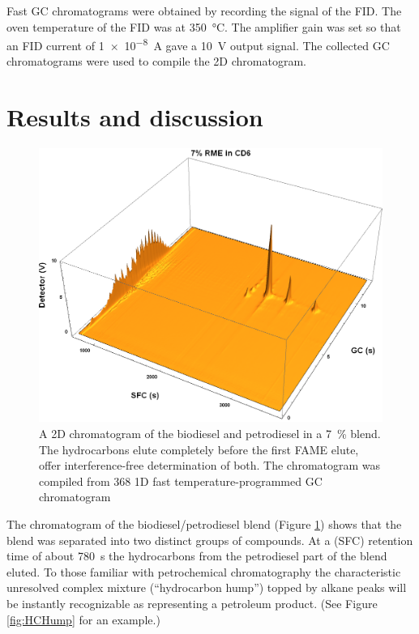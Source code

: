 Fast GC chromatograms were obtained by recording the signal of the FID. The oven
temperature of the FID was at \SI{350}{\celsius}. The amplifier gain was set so
that an FID current of \SI{1e-8}{\ampere} gave a \SI{10}{\volt} output signal.
The collected GC chromatograms were used to compile the 2D chromatogram.

\section{Results and discussion}


\begin{figure}
	\centering
	\includegraphics[width=\textwidth]{Figures/PAH_FAMEs.png}
	\decoRule	
	
\caption[Biodiesel separated from petrodiesel.]{A 2D chromatogram of the
biodiesel and petrodiesel in a \SI{7}{\percent} blend. The hydrocarbons elute
completely before the first FAME elute, offer interference-free determination of
both. The chromatogram was compiled from \num{368} 1D fast temperature-programmed GC
chromatogram}

	\label{fig:PAH_FAMEs} 
\end{figure}




The chromatogram of the biodiesel/petrodiesel blend (Figure \ref{fig:PAH_FAMEs})
shows that the blend was separated into two distinct groups of compounds. At a
\oneD (SFC) retention time of about \SI{780}{\second} the hydrocarbons from the
petrodiesel part of the blend eluted. To those familiar with petrochemical
chromatography the characteristic unresolved complex mixture (``hydrocarbon
hump'') topped by alkane peaks will be instantly recognizable as representing a
petroleum product. (See Figure \ref{fig:HCHump} for an example.)

